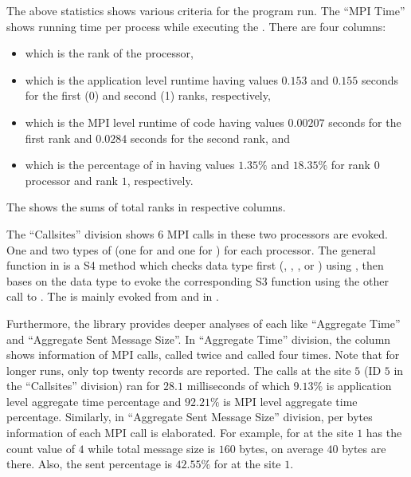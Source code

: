 The above statistics shows various criteria for the program run. The
``MPI Time'' shows running time per process while executing the
. There are four columns:
\begin{itemize}
\item
{} which is the rank of the processor,
\item
{} which is the application level runtime having
values $0.153$ and $0.155$ seconds for the first (0) and second (1) ranks,
respectively,
\item
{} which is the MPI level runtime of code having values $0.00207$
seconds for the first rank and $0.0284$ seconds for the second rank, and
\item
{} which is the percentage of  in  having
values $1.35\%$ and $18.35\%$ for rank $0$ processor and rank $1$, respectively.
\end{itemize}
The \code{*} shows the sums of total ranks in respective columns.

The ``Callsites'' division shows $6$ MPI calls in these two processors are
evoked. One  and two types of  (one for
 and one for ) for each processor.
The general  function in  is a S4 method which
checks data type first (,
, , or ) using ,
then bases on the data type to evoke the corresponding S3 function using the
other call to .
The  is mainly evoked from  and
 in .

Furthermore, the  library provides deeper analyses of each
 like ``Aggregate Time'' and ``Aggregate Sent Message Size''.
In ``Aggregate Time'' division,
the  column shows information of MPI calls,
 called twice and  called four times.
Note that for longer runs, only top twenty records are reported.
The  calls at the site $5$ (ID $5$ in the ``Callsites'' division)
ran for $28.1$ milliseconds 
of which $9.13\%$ is application level aggregate time percentage and
$92.21\%$ is MPI level aggregate time percentage.
Similarly, in ``Aggregate Sent Message Size'' division, per bytes information
of each MPI call is elaborated.
For example, for  at the site $1$ has the count value of
$4$ while total message size is $160$ bytes, on average $40$ bytes are there.
Also, the sent percentage is $42.55\%$ for  at the site $1$.





